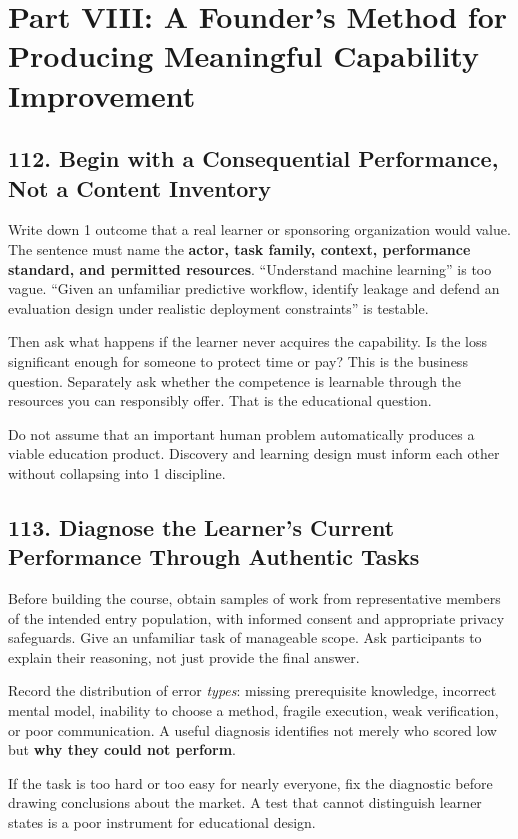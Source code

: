 \section*{Part VIII: A Founder's Method for Producing Meaningful Capability Improvement}

\subsection*{112. Begin with a Consequential Performance, Not a Content Inventory}

Write down 1 outcome that a real learner or sponsoring organization would value. The sentence must name the \textbf{actor, task family, context, performance standard, and permitted resources}. ``Understand machine learning'' is too vague. ``Given an unfamiliar predictive workflow, identify leakage and defend an evaluation design under realistic deployment constraints'' is testable.

Then ask what happens if the learner never acquires the capability. Is the loss significant enough for someone to protect time or pay? This is the business question. Separately ask whether the competence is learnable through the resources you can responsibly offer. That is the educational question.

Do not assume that an important human problem automatically produces a viable education product. Discovery and learning design must inform each other without collapsing into 1 discipline.

\subsection*{113. Diagnose the Learner's Current Performance Through Authentic Tasks}

Before building the course, obtain samples of work from representative members of the intended entry population, with informed consent and appropriate privacy safeguards. Give an unfamiliar task of manageable scope. Ask participants to explain their reasoning, not just provide the final answer.

Record the distribution of error \emph{types}: missing prerequisite knowledge, incorrect mental model, inability to choose a method, fragile execution, weak verification, or poor communication. A useful diagnosis identifies not merely who scored low but \textbf{why they could not perform}.

If the task is too hard or too easy for nearly everyone, fix the diagnostic before drawing conclusions about the market. A test that cannot distinguish learner states is a poor instrument for educational design.

